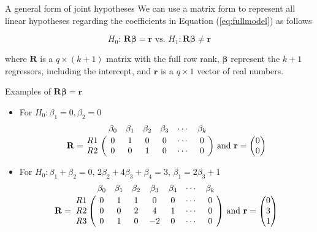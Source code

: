 \documentclass[presentation,10pt]{beamer}
\begin{document}
\begin{frame}[label={sec:org25bde99}]{A general form of joint hypotheses}
We can use a matrix form to represent all linear hypotheses regarding
the coefficients in Equation (\ref{eq:fullmodel}) as follows

\begin{equation}
\label{eq:jnt-hyp-g}
H_0:\, \mathbf{R}\boldsymbol{\beta} = \mathbf{r} \text{ vs. } H_1: \mathbf{R}\boldsymbol{\beta} \neq \mathbf{r}
\end{equation}

where \(\mathbf{R}\) is a \(q \times (k+1)\) matrix with the \alert{full row rank},
\(\boldsymbol{\beta}\) represent the \(k+1\) regressors, including
the intercept, and \(\mathbf{r}\) is a \(q \times 1\) vector of real
numbers.
\end{frame}

\begin{frame}[label={sec:org665b9f9}]{Examples of \(\mathbf{R}\boldsymbol{\beta} = \mathbf{r}\)}
\begin{itemize}
\item For \(H_0: \beta_1 = 0, \beta_2=0\)
\begin{equation*}
\mathbf{R} =
\bordermatrix{~ & \beta_0 & \beta_1 & \beta_2 & \beta_3 & \cdots & \beta_k \cr
R1 & 0 & 1 & 0 & 0 & \cdots & 0 \cr
R2 & 0 & 0 & 1 & 0 & \cdots & 0 \cr}
\text{ and }
\mathbf{r} =
\begin{pmatrix}
0 \\
0
\end{pmatrix}
\end{equation*}

\item For \(H_0: \beta_1 + \beta_2 = 0,\, 2\beta_2 + 4\beta_3 + \beta_4 =
  3,\, \beta_1 = 2 \beta_3 + 1\)
\begin{equation*}
\mathbf{R} =
\bordermatrix{~ & \beta_0 & \beta_1 & \beta_2 & \beta_3 & \beta_4 & \cdots & \beta_k \cr
R1 & 0 & 1 & 1 & 0 & 0 & \cdots & 0 \cr
R2 & 0 & 0 & 2 & 4 & 1 & \cdots & 0 \cr
R3 & 0 & 1 & 0 & -2 & 0 & \cdots & 0 \cr}
\text{ and }
\mathbf{r} =
\begin{pmatrix}
0 \\
3 \\
1
\end{pmatrix}
\end{equation*}
\end{itemize}
\end{frame}
\end{document}
